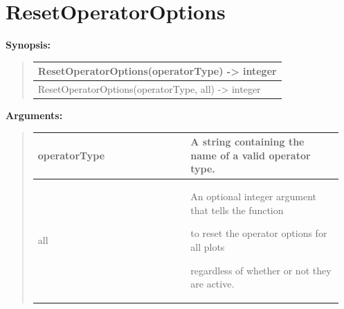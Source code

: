 \documentclass[letterpaper,10pt,english]{sphinxmanual}
\begin{document}
\begin{DUlineblock}{0em}
\item[] 
\end{DUlineblock}


\section{ResetOperatorOptions}
\label{functions:resetoperatoroptions}
\begin{DUlineblock}{0em}
\item[] \textbf{Synopsis:}
\end{DUlineblock}
\begin{quote}

\begin{tabulary}{\linewidth}{|L|}
\hline

ResetOperatorOptions(operatorType) -\textgreater{} integer
\\
\hline
ResetOperatorOptions(operatorType, all) -\textgreater{} integer
\\
\hline\end{tabulary}

\end{quote}

\begin{DUlineblock}{0em}
\item[] 
\item[] \textbf{Arguments:}
\end{DUlineblock}
\begin{quote}

\begin{tabular}{|p{0.475\linewidth}|p{0.475\linewidth}|}
\hline

operatorType
 & 
A string containing the name of a valid operator type.
\\
\hline
all
 & 
\begin{DUlineblock}{0em}
\item[] An optional integer argument that tells the function
\item[] to reset the operator options for all plots
\item[] regardless of whether or not they are active.
\end{DUlineblock}
\\
\hline\end{tabular}

\end{quote}
\end{document}
